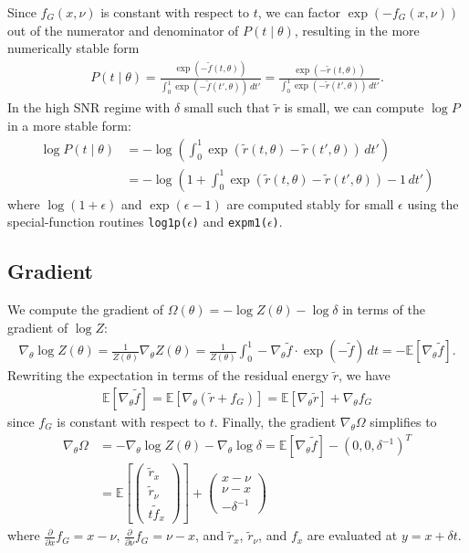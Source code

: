 \documentclass{article}
\begin{document}
Since $f_G(x,\nu)$ is constant with respect to $t$, we can factor $\exp(-f_G(x,\nu))$ out of the numerator and denominator of $P(t \mid \theta)$, resulting in the more numerically stable form
%
\begin{align}
  P(t \mid \theta)
  = \frac{\exp(-\tilde{f}(t, \theta))}{\int_0^1 \exp(-\tilde{f}(t', \theta)) \, dt'}
  = \frac{\exp(-\tilde{r}(t, \theta))}{\int_0^1 \exp(-\tilde{r}(t', \theta)) \, dt'}.
\end{align}
%
In the high SNR regime with $\delta$ small such that $\tilde{r}$ is small, we can compute $\log P$ in a more stable form:
%
\begin{align}
  \log P(t \mid \theta)
   & = -\log \left( \int_0^1 \exp(\tilde{r}(t, \theta) - \tilde{r}(t', \theta)) \, dt' \right)        \\
   & = -\log \left(1 + \int_0^1 \exp(\tilde{r}(t, \theta) - \tilde{r}(t', \theta)) - 1 \, dt' \right)
\end{align}
%
where $\log(1 + \epsilon)$ and $\exp(\epsilon - 1)$ are computed stably for small $\epsilon$ using the special-function routines \texttt{log1p($\epsilon$)} and \texttt{expm1($\epsilon$)}.

\subsection{Gradient}

We compute the gradient of $\Omega(\theta) = -\log Z(\theta) - \log\delta$ in terms of the gradient of $\log Z$:
%
\begin{align}
  \nabla_{\theta} \log Z(\theta) = \frac{1}{Z(\theta)}\nabla_{\theta} Z(\theta) = \frac{1}{Z(\theta)}\int_0^1 -\nabla_{\theta}\tilde{f} \cdot \exp(-\tilde{f}) \, dt = -\mathbb{E}[\nabla_{\theta}\tilde{f}].
\end{align}
%
Rewriting the expectation in terms of the residual energy $\tilde{r}$, we have
%
\begin{align}
  \mathbb{E}[\nabla_{\theta}\tilde{f}] = \mathbb{E}[\nabla_{\theta} (\tilde{r} + f_G)] = \mathbb{E}[\nabla_{\theta} \tilde{r}] + \nabla_{\theta} f_G
\end{align}
%
since $f_G$ is constant with respect to $t$.
Finally, the gradient $\nabla_{\theta} \Omega$ simplifies to
%
\begin{align}
  \nabla_{\theta} \Omega & = - \nabla_\theta \log Z(\theta) - \nabla_\theta \log\delta = \mathbb{E}[\nabla_{\theta} \tilde{f}] - (0, 0, \delta^{-1})^T \\
                         & = \mathbb{E}\left[ \begin{pmatrix} \tilde{r}_x \\ \tilde{r}_\nu \\ t \tilde{f}_x \end{pmatrix} \right]
  + \begin{pmatrix} x - \nu \\ \nu - x \\ -\delta^{-1} \end{pmatrix}
\end{align}
%
where $\frac{\partial}{\partial x} f_G = x - \nu$, $\frac{\partial}{\partial \nu} f_G = \nu - x$, and $\tilde{r}_x$, $\tilde{r}_\nu$, and $f_x$ are evaluated at $y=x+\delta t$.
\end{document}
